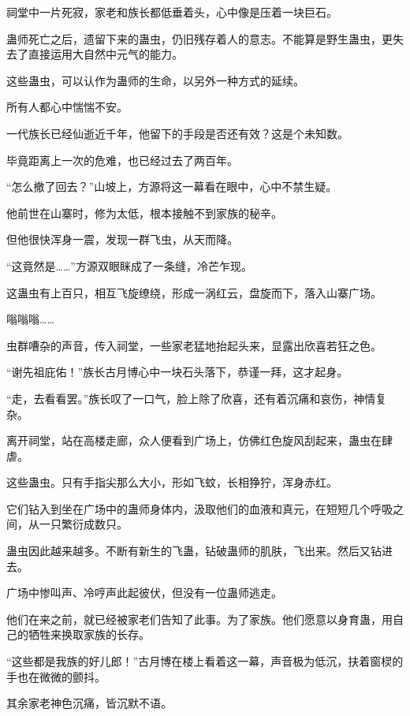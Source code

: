
\begin{this_body}



祠堂中一片死寂，家老和族长都低垂着头，心中像是压着一块巨石。

蛊师死亡之后，遗留下来的蛊虫，仍旧残存着人的意志。不能算是野生蛊虫，更失去了直接运用大自然中元气的能力。

这些蛊虫，可以认作为蛊师的生命，以另外一种方式的延续。

所有人都心中惴惴不安。

一代族长已经仙逝近千年，他留下的手段是否还有效？这是个未知数。

毕竟距离上一次的危难，也已经过去了两百年。

“怎么撤了回去？”山坡上，方源将这一幕看在眼中，心中不禁生疑。

他前世在山寨时，修为太低，根本接触不到家族的秘辛。

但他很快浑身一震，发现一群飞虫，从天而降。

“这竟然是……”方源双眼眯成了一条缝，冷芒乍现。

这蛊虫有上百只，相互飞旋缭绕，形成一涡红云，盘旋而下，落入山寨广场。

嗡嗡嗡……

虫群嘈杂的声音，传入祠堂，一些家老猛地抬起头来，显露出欣喜若狂之色。

“谢先祖庇佑！”族长古月博心中一块石头落下，恭谨一拜，这才起身。

“走，去看看罢。”族长叹了一口气，脸上除了欣喜，还有着沉痛和哀伤，神情复杂。

离开祠堂，站在高楼走廊，众人便看到广场上，仿佛红色旋风刮起来，蛊虫在肆虐。

这些蛊虫。只有手指尖那么大小，形如飞蚊，长相狰狞，浑身赤红。

它们钻入到坐在广场中的蛊师身体内，汲取他们的血液和真元，在短短几个呼吸之间，从一只繁衍成数只。

蛊虫因此越来越多。不断有新生的飞蛊，钻破蛊师的肌肤，飞出来。然后又钻进去。

广场中惨叫声、冷哼声此起彼伏，但没有一位蛊师逃走。

他们在来之前，就已经被家老们告知了此事。为了家族。他们愿意以身育蛊，用自己的牺牲来换取家族的长存。

“这些都是我族的好儿郎！”古月博在楼上看着这一幕，声音极为低沉，扶着窗棂的手也在微微的颤抖。

其余家老神色沉痛，皆沉默不语。


\end{this_body}
